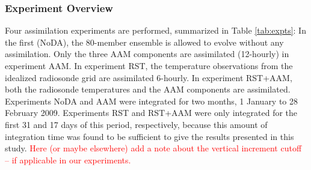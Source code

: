 \subsubsection{Experiment Overview}
Four assimilation experiments are performed, summarized in Table \ref{tab:expts}: In the first (NoDA), the 80-member ensemble is allowed to evolve without any assimilation. 
Only the three  AAM components are assimilated (12-hourly) in experiment AAM.  
In experiment RST, the temperature observations from the idealized radiosonde grid are assimilated 6-hourly.
In experiment RST+AAM, both the radiosonde temperatures and the AAM components are assimilated. 
Experiments NoDA and AAM were integrated for two months, 1 January to 28 February 2009.  
Experiments RST and RST+AAM were only integrated for the first 31 and 17 days of this period, respectively, because this amount of integration time was found to be sufficient to give the results presented in this study.
\textcolor{red}{Here (or maybe elsewhere) add a note about the vertical increment cutoff -- if applicable in our experiments.}
